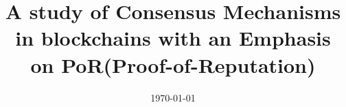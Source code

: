 \documentclass[doublespacing]{bmcart}
\begin{document}
\linenumbers
\begin{CJK*}{UTF8}{gbsn}

\begin{frontmatter}

\begin{fmbox}

\date{\today}
\title{A study of Consensus Mechanisms in blockchains with an Emphasis on PoR(Proof-of-Reputation)}
\maketitle


\author[
   addressref={aff1},                   %
   email={yidi.xing@insa-lyon.fr}   %
]{ }

\author[
   addressref={aff1},              
   email={omar.hasan@insa-lyon.fr}   %
]{ }

\author[
   addressref={aff1},              
   email={sonia.benmokhtar@insa-lyon.fr}   %
]{ }

\author[
   addressref={aff1},              
   email={lionel.brunie@insa-lyon.fr}   %
]{ }


\end{fmbox}
\end{frontmatter}
\end{CJK*}
\end{document}
